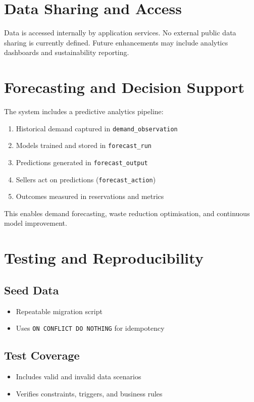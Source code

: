 \documentclass[12pt]{article}
\begin{document}
\section{Data Sharing and Access}
Data is accessed internally by application services. No external public data sharing is currently defined. Future enhancements may include analytics dashboards and sustainability reporting.

\section{Forecasting and Decision Support}
The system includes a predictive analytics pipeline:
\begin{enumerate}
\item Historical demand captured in \texttt{demand\_observation}
\item Models trained and stored in \texttt{forecast\_run}
\item Predictions generated in \texttt{forecast\_output}
\item Sellers act on predictions (\texttt{forecast\_action})
\item Outcomes measured in reservations and metrics
\end{enumerate}
This enables demand forecasting, waste reduction optimisation, and continuous model improvement.

\section{Testing and Reproducibility}
\subsection{Seed Data}
\begin{itemize}
\item Repeatable migration script
\item Uses \texttt{ON CONFLICT DO NOTHING} for idempotency
\end{itemize}

\subsection{Test Coverage}
\begin{itemize}
\item Includes valid and invalid data scenarios
\item Verifies constraints, triggers, and business rules
\end{itemize}
\end{document}
